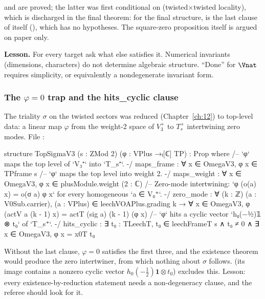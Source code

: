 \begin{status}
 and  are proved; the latter was first
conditional on  (twisted$\times$twisted locality), which is discharged in the final
theorem: for the final structure,  is the last clause of 
itself (), which has no hypotheses. The square-zero proposition itself is argued on paper only.
\end{status}

\begin{warning}
\textbf{Lesson.} For every target ask what else satisfies it. Numerical invariants (dimensions,
characters) do not determine algebraic structure. ``Done'' for $\Vnat$ requires simplicity, or
equivalently a nondegenerate invariant form.
\end{warning}

\subsubsection{The $\varphi=0$ trap and the hits\_cyclic clause}\label{ch15:sec:phi0}

The triality $\sigma$ on the twisted sectors was reduced (Chapter~\ref{ch:12}) to top-level data:
a linear map $\varphi$ from the weight-2 space of $V_3^+$ to $T_s^+$ intertwining zero modes. File
:
\begin{leancode}
structure TopSigmaV3 (s : ZMod 2) (φ : VPlus →ₗ[ℂ] TP) : Prop where
  /-- `φ` maps the top level of `V₃⁺` into `T_s⁺`. -/
  maps_frame : ∀ x ∈ OmegaV3, φ x ∈ TPframe s
  /-- `φ` maps the top level into weight 2. -/
  maps_weight : ∀ x ∈ OmegaV3, φ x ∈ plusModule.weight (2 : ℂ)
  /-- Zero-mode intertwining: `φ (o(a) x) = o(σ a) φ x` for every homogeneous `a ∈ V₀⁺`. -/
  zero_mode : ∀ (k : ℤ) (a : V0Sub.carrier), (a : VPlus) ∈ leechVOAPlus.grading k →
    ∀ x ∈ OmegaV3, φ (actV a (k - 1) x) = actT (sig a) (k - 1) (φ x)
  /-- `φ` hits a cyclic vector `h₀(−½)𝟙 ⊗ t₀` of `T_s⁺`. -/
  hits_cyclic : ∃ t₀ : TLeechT, t₀ ∈ leechFrameT s ∧ t₀ ≠ 0 ∧ ∃ x ∈ OmegaV3, φ x = x0T t₀
\end{leancode}
\begin{warning}
Without the last clause, $\varphi=0$ satisfies the first three, and the existence theorem
 would produce the zero intertwiner, from which nothing about $\sigma$
follows.  (its image contains a nonzero cyclic vector $h_0(-\frac12)\mathbf
1\otimes t_0$) excludes this. Lesson: every existence-by-reduction statement needs a
non-degeneracy clause, and the referee should look for it.
\end{warning}

